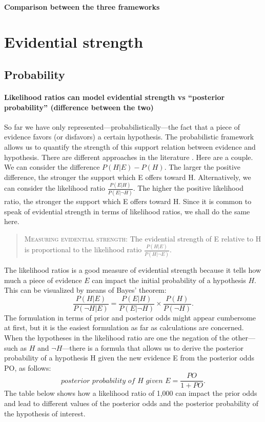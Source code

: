 \documentclass[10pt]{article}
\begin{document}
\paragraph{Comparison between the three frameworks}




\section{Evidential strength}

\subsection{Probability}


\paragraph{Likelihood ratios can model evidential strength vs ``posterior probability'' (difference between the two)}

So far we have only represented---probabilistically---the fact that a piece of 
evidence favors (or disfavors) a certain hypothesis. The probabilistic framework 
allows us to quantify the strength of this support relation between evidence and hypothesis. 
There are different approaches in the literature \citep{Fitelson2006}. Here are a couple. 
We can consider the difference $P(H|E) - P(H)$. The larger the positive difference, the stronger the support 
which E offers toward H. Alternatively, we can consider the likelihood ratio $\frac{P(E|H)}{P(E| \neg H)}$. 
The higher the positive likelihood ratio, the stronger the support which E offers toward H. 
Since it is common to speak of evidential strength in terms of likelihood ratios, 
we shall do the same here. 
%
\begin{quote}
\textsc{Measuring evidential strength:} The evidential strength of E relative to H is proportional to 
the likelihood ratio $\frac{P(H|E)}{P(H|\neg E)}$. 
\end{quote}
%
The likelihood ratios is a good measure of evidential strength because it tells how much a piece 
of evidence $E$ can impact the initial probability of a hypothesis $H$. This can be visualized by means of 
Bayes' theorem:
%
\[\frac{P(H|E)}{P(\neg H | E)} = \frac{P(E|H)}{P(E|\neg H)} \times \frac{P(H)}{P(\neg H)}.\]
%
The formulation in terms of prior and posterior odds might appear cumbersome at first, but it is the easiest
formulation as far as calculations are concerned. When the hypotheses in the likelihood ratio are one the negation of the other---such as $H$ and $\neg H$---there 
is a formula that allows us to derive the posterior probability of a hypothesis H given the new evidence E
from the posterior odds PO, as follows:
\[ \textit{posterior probability of H given E} = \frac{PO}{1+PO}.\]
%
%
%
The table below shows how a likelihood ratio of 1,000 can 
impact the prior odds and lead to different values of the 
posterior odds and the posterior 
probability of the hypothesis of interest. 
\end{document}
